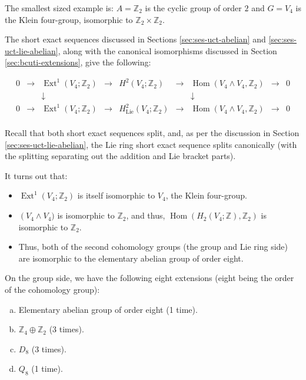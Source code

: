 \documentclass[10pt]{amsart}
\begin{document}
The smallest sized example is: $A = \mathbb{Z}_2$ is the cyclic group
of order $2$ and $G = V_4$ is the Klein four-group, isomorphic to
$\mathbb{Z}_2 \times \mathbb{Z}_2$.

The short exact sequences discussed in Sections
\ref{sec:ses-uct-abelian} and \ref{sec:ses-uct-lie-abelian}, along
with the canonical isomorphisms discussed in Section
\ref{sec:bcuti-extensions}, give the following:

$$\begin{array}{ccccccccc}
0 & \to & \operatorname{Ext}^1(V_4;\mathbb{Z}_2) & \to & H^2(V_4;\mathbb{Z}_2) & \to & \operatorname{Hom}(V_4 \wedge V_4,\mathbb{Z}_2) & \to & 0 \\
& & \downarrow & & & & \downarrow & & \\
0 & \to & \operatorname{Ext}^1(V_4;\mathbb{Z}_2) & \to & H^2_{\text{Lie}}(V_4;\mathbb{Z}_2) & \to & \operatorname{Hom}(V_4 \wedge V_4,\mathbb{Z}_2) & \to & 0\\
\end{array}$$

Recall that both short exact sequences split, and, as per the
discussion in Section \ref{sec:ses-uct-lie-abelian}, the Lie ring
short exact sequence splits canonically (with the splitting separating
out the addition and Lie bracket parts).

It turns out that:

\begin{itemize}
\item $\operatorname{Ext}^1(V_4;\mathbb{Z}_2)$ is itself isomorphic to $V_4$, the Klein four-group.
\item $\operatorname(V_4 \wedge V_4)$ is isomorphic to $\mathbb{Z}_2$,
  and thus, $\operatorname{Hom}(H_2(V_4;\mathbb{Z}),\mathbb{Z}_2)$ is
  isomorphic to $\mathbb{Z}_2$.
\item Thus, both of the second cohomology groups (the group and Lie
  ring side) are isomorphic to the elementary abelian group of order
  eight.
\end{itemize}

On the group side, we have the following eight extensions (eight being
the order of the cohomology group):

\begin{enumerate}[(a)]
\item Elementary abelian group of order eight (1 time).
\item $\mathbb{Z}_4 \oplus \mathbb{Z}_2$ (3 times).
\item $D_8$ (3 times).
\item $Q_8$ (1 time).
\end{enumerate}
\end{document}
